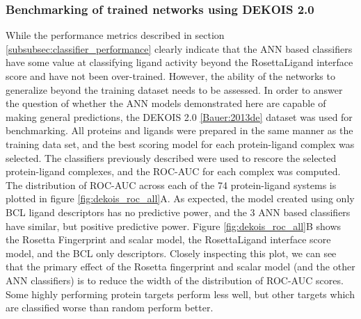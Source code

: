 \subsubsection{Benchmarking of trained networks using DEKOIS 2.0}
While the performance metrics described in section \ref{subsubsec:classifier_performance} clearly indicate that the ANN based classifiers have some value at classifying ligand activity beyond the RosettaLigand interface score and have not been over-trained.
However, the ability of the networks to generalize beyond the training dataset needs to be assessed.
In order to answer the question of whether the ANN models demonstrated here are capable of making general predictions, the DEKOIS 2.0 \ref{Bauer:2013de} dataset was used for benchmarking. 
All proteins and ligands were prepared in the same manner as the training data set, and the best scoring model for each protein-ligand complex was selected.
The classifiers previously described were used to rescore the selected protein-ligand complexes, and the ROC-AUC for each complex was computed. 
The distribution of ROC-AUC across each of the 74 protein-ligand systems is plotted in figure \ref{fig:dekois_roc_all}A.
As expected, the model created using only BCL ligand descriptors has no predictive power, and the 3 ANN based classifiers have similar, but positive predictive power.
Figure \ref{fig:dekois_roc_all}B shows the Rosetta Fingerprint and scalar model, the RosettaLigand interface score model, and the BCL only descriptors.
Closely inspecting this plot, we can see that the primary effect of the Rosetta fingerprint and scalar model (and the other ANN classifiers) is to reduce the width of the distribution of ROC-AUC scores.  Some highly performing protein targets perform less well, but other targets which are classified worse than random perform better. 

